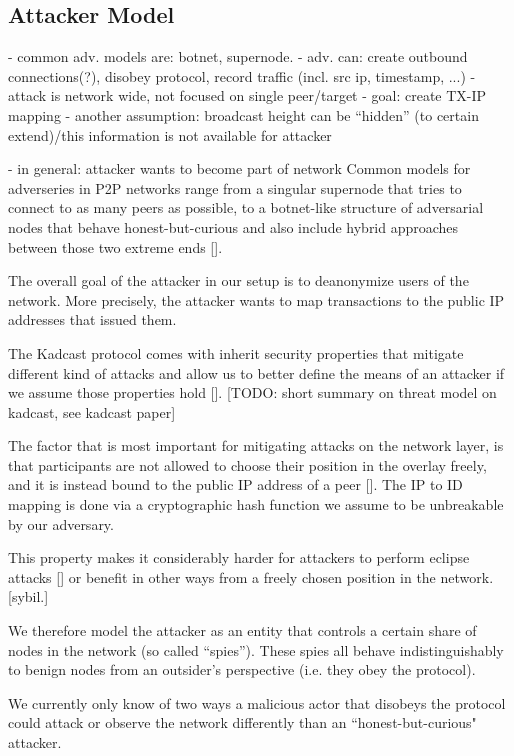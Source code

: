 \subsection{Attacker Model}
- common adv. models are: botnet, supernode.
- adv. can: create outbound connections(?), disobey protocol, record traffic (incl. src ip, timestamp, ...)
- attack is network wide, not focused on single peer/target
- goal: create TX-IP mapping
- another assumption: broadcast height can be ``hidden'' (to certain extend)/this information is not available for attacker

- in general: attacker wants to become part of network
Common models for adverseries in P2P networks range from a singular supernode that tries
to connect to as many peers as possible, to a botnet-like structure of adversarial nodes that behave honest-but-curious
and also include hybrid approaches between those two extreme ends [].


The overall goal of the attacker in our setup is to deanonymize users of the network.
More precisely, the attacker wants to map transactions to the public IP addresses that issued them.

The Kadcast protocol comes with inherit security properties that mitigate different kind of attacks
and allow us to better define the means of an attacker if we assume those properties hold [].
[TODO: short summary on threat model on kadcast, see kadcast paper]

The factor that is most important for mitigating attacks on the network layer, is that participants are
not allowed to choose their position in the overlay freely, and it is instead bound to the public IP address of a peer [].
The IP to ID mapping is done via a cryptographic hash function we assume to be unbreakable by our adversary. %

This property makes it considerably harder for attackers to perform eclipse attacks [] or benefit in other ways from
a freely chosen position in the network. [sybil.]

We therefore model the attacker as an entity that controls a certain share of nodes in the network (so called ``spies'').
These spies all behave indistinguishably to benign nodes from an outsider's perspective (i.e. they obey the protocol).

We currently only know of two ways a malicious actor that disobeys the protocol could attack or observe the network differently than
an ``honest-but-curious" attacker.


